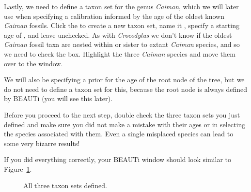 {    Lastly, we need to define a taxon set for the genus \emph{Caiman}, which we
    will later use when specifying a calibration informed by the age of the
    oldest known \emph{Caiman} fossils.  Click the \plusbutton to create a new
    taxon set, name it , specify a starting age of
    , and leave  unchecked.
    As with \emph{Crocodylus} we don't know if the oldest \emph{Caiman} fossil
    taxa are nested within or sister to extant \emph{Caiman} species, and so we
    need to check the  box.
    Highlight the three \emph{Caiman} species and move them over to the
     window.

    We will also be specifying a prior for the age of the root node of the
    tree, but we do not need to define a taxon set for this, because the root
    node is always defined by BEAUTi (you will see this later).

    Before you proceed to the next step, double check the three taxon sets
    you just defined and make sure you did not make a mistake with their
    ages or in selecting the species associated with them. Even a single
    misplaced species can lead to some very bizarre results!

    If you did everything correctly, your BEAUTi window should look similar to
    Figure~\ref{fig:beautiTaxSets}.

    \begin{figure}[htbp]
        \centering
        \caption{All three taxon sets defined.}
        \label{fig:beautiTaxSets}
    \end{figure}
}

